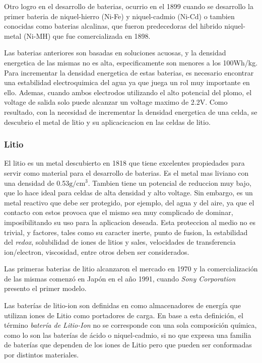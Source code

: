 \documentclass[10pt,a4paper]{article}
\begin{document}
    \noindent Otro logro en el desarrollo de baterias, ocurrio en el 1899 cuando 
    se desarrollo la primer bateria de niquel-hierro (Ni-Fe) y niquel-cadmio
    (Ni-Cd) o tambien conocidas como baterias alcalinas, que fueron
    predecedoras del hibrido niquel-metal (Ni-MH) que fue comercializada en
    1898.
    
    \noindent Las baterias anteriores son basadas en soluciones acuosas, y la
    densidad energetica de las mismas no es alta, especificamente son menores a
    los 100Wh/kg. Para incrementar la densidad energetica de estas baterias, es necesario
    encontrar una estabilidad electroquimica del agua ya que juega un rol muy
    importante en ello. Ademas, cuando ambos electrodos utilizando el alto 
    potencial del plomo, el voltage de salida solo puede alcanzar un voltage 
    maximo de 2.2V. Como resultado, con la necesidad de incrementar la densidad
    energetica de una celda, se descubrio el metal de litio y su aplicacicacion
    en las celdas de litio.


    \subsubsection{Litio}

    El litio es un metal descubierto en 1818 que tiene excelentes 
    propiedades para servir como material para el desarrollo de baterias. 
    Es el metal mas liviano con una densidad de 0.53$\mathrm{g/cm^3}$. 
    Tambien tiene un potencial de reduccion muy bajo, que lo hace ideal para 
    celdas de alta densidad y alto voltage. Sin embargo, es un metal 
    reactivo que debe ser protegido, por ejemplo, del agua y del aire, 
    ya que el contacto con estos provoca que el mismo sea muy complicado de 
    dominar, imposibilitando su uso para la aplicacion deseada. 
    Esta proteccion al medio no es trivial, y factores, tales como 
    su caracter inerte, punto de fusion, la estabilidad del \emph{redox}, 
    solubilidad de iones de litios y sales, velocidades de transferencia 
    ion/electron, viscosidad, entre otros deben ser considerados.
    
    \noindent Las primeras baterias de litio alcanzaron el mercado en 1970 y la 
    comercialización de las mismas comenzó en Japón en el año
    1991, cuando \emph{Sony Corporation} presento el primer modelo.
    
	\noindent Las baterías de litio-ion son definidas en \cite{def_liion} como 
    almacenadores de energía que utilizan iones de Litio como portadores de 
    carga. En base a esta definición, el término \emph{batería de Litio-Ion} no 
    se corresponde con una sola composición química, como lo son las baterías 
    de ácido o niquel-cadmio, si no que expresa una familia de baterías que 
    dependen de los iones de Litio pero que pueden ser conformadas por 
    distintos materiales.
    
\end{document}
